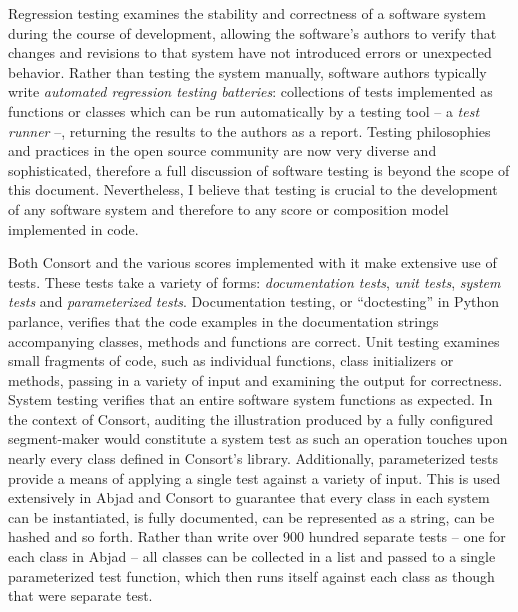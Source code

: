 
Regression testing\cite{beazley2013python} examines the stability and
correctness of a software system during the course of development, allowing the
software's authors to verify that changes and revisions to that system have not
introduced errors or unexpected behavior. Rather than testing the system
manually, software authors typically write \emph{automated regression testing
batteries}: collections of tests implemented as functions or classes which can
be run automatically by a testing tool -- a \emph{test runner} --, returning
the results to the authors as a report. Testing philosophies and practices in
the open source community are now very diverse and sophisticated, therefore a
full discussion of software testing is beyond the scope of this document.
Nevertheless, I believe that testing is crucial to the development of any
software system and therefore to any score or composition model implemented in
code.

Both Consort and the various scores implemented with it make extensive use of
tests. These tests take a variety of forms: \emph{documentation tests},
\emph{unit tests}, \emph{system tests} and \emph{parameterized tests}.
Documentation testing, or \enquote{doctesting} in Python parlance, verifies
that the code examples in the documentation strings accompanying classes,
methods and functions are correct. Unit testing examines small fragments of
code, such as individual functions, class initializers or methods, passing in a
variety of input and examining the output for correctness. System testing
verifies that an entire software system functions as expected. In the context
of Consort, auditing the illustration produced by a fully configured
segment-maker would constitute a system test as such an operation touches upon
nearly every class defined in Consort's library. Additionally, parameterized
tests provide a means of applying a single test against a variety of input.
This is used extensively in Abjad and Consort to guarantee that every class in
each system can be instantiated, is fully documented, can be represented as a
string, can be hashed and so forth. Rather than write over 900 hundred separate
tests -- one for each class in Abjad -- all classes can be collected in a list
and passed to a single parameterized test function, which then runs itself
against each class as though that were separate test.

